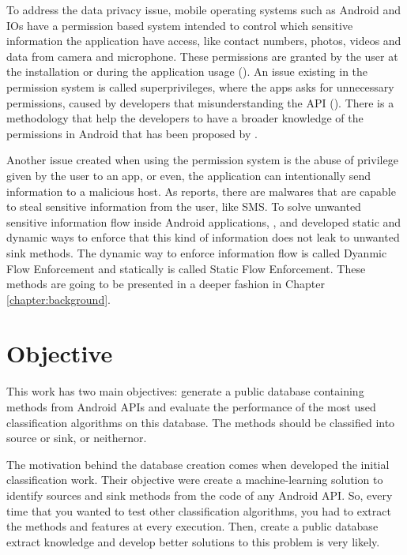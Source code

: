To address the data privacy issue, mobile operating systems such as Android and IOs have a permission based system intended to control which sensitive information the application have access, like contact numbers, photos, videos and data from camera and microphone. These permissions are granted by the user at the installation or during the application usage (\cite{androidpermissions}). An issue existing in the permission system is called superprivileges, where the apps asks for unnecessary permissions, caused by developers that misunderstanding the API (\cite{felt2011android}). There is a methodology that help the developers to have a broader knowledge of the permissions in Android that has been proposed by \cite{barrera2010methodology}.

Another issue created when using the permission system is the abuse of privilege given by the user to an app, or even, the application can intentionally send information to a malicious host. As \cite{jiang2012dissecting} reports, there are malwares that are capable to steal sensitive information from the user, like SMS. To solve unwanted sensitive information flow inside Android applications, \cite{arzt2014flowdroid}, \cite{wei2014amandroid} and \cite{gordon2015information} developed static and dynamic ways to enforce that this kind of information does not leak to unwanted sink methods. The dynamic way to enforce information flow is called Dyanmic Flow Enforcement and statically is called Static Flow Enforcement. These methods are going to be presented in a deeper fashion in Chapter \ref{chapter:background}.


\section{Objective}\label{section:background}

This work has two main objectives: generate a public database containing methods from Android APIs and evaluate the performance of the most used classification algorithms on this database. The methods should be classified into source or sink, or neithernor.

The motivation behind the database creation comes when \cite{rasthofer2014machine} developed the initial classification work. Their objective were create a machine-learning solution to identify sources and sink methods from the code of any Android API. So, every time that you wanted to test other classification algorithms, you had  to extract the methods and features at every execution. Then, create a public database extract knowledge and  develop better solutions to this problem is very likely.

